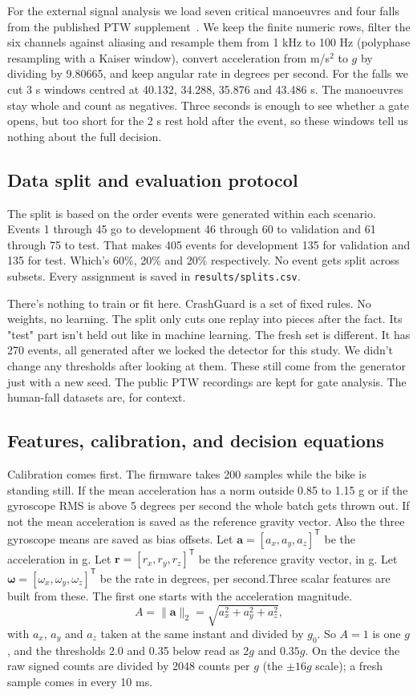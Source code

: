 \documentclass[10pt,a4paper]{article}
\begin{document}
For the external signal analysis we load seven critical manoeuvres and four falls from the published PTW supplement~\cite{boubezoul2019dataset}. We keep the finite numeric rows, filter the six channels against aliasing and resample them from 1 kHz to 100 Hz (polyphase resampling with a Kaiser window), convert acceleration from m/s$^2$ to $g$ by dividing by 9.80665, and keep angular rate in degrees per second. For the falls we cut 3 s windows centred at 40.132, 34.288, 35.876 and 43.486 s. The manoeuvres stay whole and count as negatives. Three seconds is enough to see whether a gate opens, but too short for the 2 s rest hold after the event, so these windows tell us nothing about the full decision.

\subsection{Data split and evaluation protocol}
The split is based on the order events were generated within each scenario. Events 1 through 45 go to development 46 through 60 to validation and 61 through 75 to test. That makes 405 events for development 135 for validation and 135 for test. Which's 60\%, 20\% and 20\% respectively. No event gets split across subsets. Every assignment is saved in \texttt{results/splits.csv}.

There's nothing to train or fit here. CrashGuard is a set of fixed rules. No weights, no learning. The split only cuts one replay into pieces after the fact. Its "test" part isn't held out like in machine learning. The fresh set is different. It has 270 events, all generated after we locked the detector for this study. We didn't change any thresholds after looking at them. These still come from the generator just with a new seed. The public PTW recordings are kept for gate analysis. The human-fall datasets are, for context.

\subsection{Features, calibration, and decision equations}
Calibration comes first. The firmware takes 200 samples while the bike is standing still. If the mean acceleration has a norm outside 0.85 to 1.15 g or if the gyroscope RMS is above 5 degrees per second the whole batch gets thrown out. If not the mean acceleration is saved as the reference gravity vector. Also the three gyroscope means are saved as bias offsets. Let $\mathbf a=[a_x,a_y,a_z]^{\mathsf T}$ be the acceleration in g. Let $\mathbf r=[r_x,r_y,r_z]^{\mathsf T}$ be the reference gravity vector, in g. Let $\boldsymbol\omega=[\omega_x,\omega_y,\omega_z]^{\mathsf T}$ be the rate in degrees, per second.Three scalar features are built from these. The first one starts with the acceleration magnitude.
\begin{equation}\label{eq:accel}
A=\|\mathbf a\|_2=\sqrt{a_x^2+a_y^2+a_z^2},
\end{equation}
with $a_x$, $a_y$ and $a_z$ taken at the same instant and divided by $g_0$. So $A=1$ is one $g$, and the thresholds 2.0 and 0.35 below read as $2g$ and $0.35g$. On the device the raw signed counts are divided by 2048 counts per $g$ (the $\pm16g$ scale); a fresh sample comes in every 10 ms.
\end{document}
